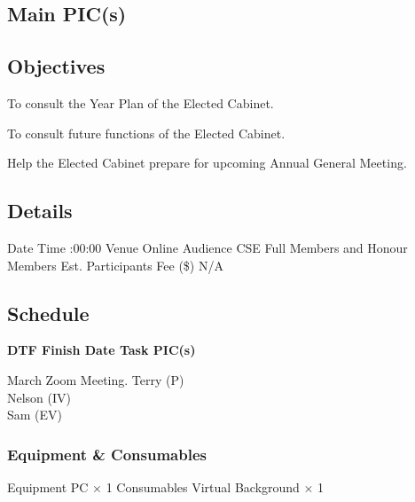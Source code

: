 \startsection[title={CSESS Consultation}][
date={25\high{th} February \endash\ 9\high{th} March, 2024 (Sunday \endash\ Saturday)},
pic={Terry (P), Nelson (IV), Sam (EV)}]

\subsection{Main PIC(s)}

\subsection{Objectives}
\startitemize
\item To consult the Year Plan of the Elected Cabinet.
\item To consult future functions of the Elected Cabinet.
\item Help the Elected Cabinet prepare for upcoming Annual General Meeting.
\stopitemize

\subsection{Details}
\starttabulate[|rB|l|]
\NC Date
\NC {} \NR
\NC Time
:00:00 \NR
\NC Venue
\NC Online \NR
\NC Audience
\NC CSE Full Members and Honour Members \NR
\NC Est. Participants
 \NR
\NC Fee (\$)
\NC N/A \NR
\stoptabulate

\subsection{Schedule}

\setupTABLE[c][1][width=0.75in]
\setupTABLE[c][2][width=1in]
\setupTABLE[c][3][width=3in]
\setupTABLE[c][4][width=1.25in]
\bTABLE
\bTABLEhead

\bTR\bTH    \bf{DTF}
\eTH\bTH    \bf{Finish Date}
\eTH\bTH    \bf{Task}
\eTH\bTH    \bf{PIC(s)}
\eTH\eTR

\eTABLEhead
\bTABLEbody

\bTR{}
\eTD{} March
\eTD\bTD Zoom Meeting.
\eTD\bTD Terry (P) \\ Nelson (IV) \\ Sam (EV)
\eTD\eTR

\eTABLEbody
\eTABLE

\subsubsection{Equipment \& Consumables}
\starttabulate[|l|l|]
\NC{}Equipment\NC\NR
\HL
\NC PC \NC $\times$ 1 \NR
\HL
\NR
\NC{}Consumables\NC\NR
\HL
\NC Virtual Background \NC $\times$ 1 \NR
\HL
\stoptabulate

